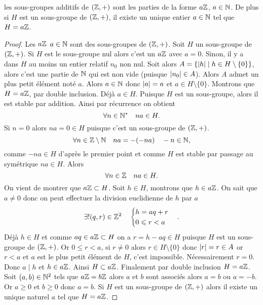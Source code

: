 \begin{theo}
  les sous-groupes additifs de \((\mathbb{Z},+)\) sont les parties de la forme \(a\mathbb{Z}\), \(a \in \mathbb{N}\). De plus si \(H\) est un sous-groupe de \((\mathbb{Z},+)\), il existe un unique entier \(a \in \mathbb{N}\) tel que \(H=a\mathbb{Z}\).
\end{theo}
\begin{proof}
  Les \(a\mathbb{Z}\) \(a \in \mathbb{N}\) sont des sous-groupes de \((\mathbb{Z},+)\). Soit \(H\) un sous-groupe de \((\mathbb{Z},+)\). Si \(H\) est le sous-groupe nul alors c'est un \(a\mathbb{Z}\) avec \(a=0\). Sinon, il y a dans \(H\) au moins un entier relatif \(n_0\) non nul. Soit alors \(A=\left\{\left\lvert h\right\rvert\mathrel{}\middle|\mathrel{}h \in H\setminus\{0\}\right\}\), alors c'est une partie de \(\mathbb{N}\) qui est non vide (puisque \(\left\lvert n_0\right\rvert \in A\)). Alors \(A\) admet un plus petit élément noté \(a\). Alors \(a \in \mathbb{N}\) donc \(\left\lvert a\right\rvert=a\) et \(a \in H\setminus\{0\}\). Montrons que \(H=a\mathbb{Z}\), par double inclusion. Déjà \(a \in H\). Puisque \(H\) est un sous-groupe, alors il est stable par addition. Ainsi par récurrence on obtient
  \begin{equation}
    \forall n \in \mathbb{N}^* \quad na \in H.
  \end{equation}
  Si \(n=0\) alors \(na=0 \in H\) puisque c'est un sous-groupe de \((\mathbb{Z},+)\). %
  \begin{equation}
    \forall n \in \mathbb{Z}\setminus\mathbb{N} \quad na=-(-na) \quad -n \in \mathbb{N},
  \end{equation}
  comme \(-na \in H\) d'après le premier point et comme \(H\) est stable par passage au symétrique \(na \in H\). Alors
  \begin{equation}
    \forall n \in \mathbb{Z} \quad na \in H.
  \end{equation}
  On vient de montrer que \(a\mathbb{Z} \subset H\). Soit \(h \in H\), montrons que \(h \in a\mathbb{Z}\). On sait que \(a \neq 0\) donc on peut effectuer la division euclidienne de \(h\) par \(a\)
  \begin{equation}
    \exists! (q,r) \in \mathbb{Z}^2 \quad \begin{cases} h=aq+r \\ 0 \leqslant r < a \end{cases}.
  \end{equation}
  Déjà \(h \in H\) et comme \(aq \in a\mathbb{Z} \subset H\) on a \(r=h-aq \in H\) puisque \(H\) est un sous-groupe de \((\mathbb{Z},+)\). Or \(0 \leqslant r < a\), si \(r \neq 0\) alors \(r \in H\setminus\{0\}\) donc \(\left\lvert r\right\rvert=r \in A\) or \(r < a\) et \(a\) est le plus petit élément de \(H\), c'est impossible. Nécessairement \(r=0\). Donc \(a\mid h\) et \(h \in a\mathbb{Z}\). Ainsi \(H \subset a\mathbb{Z}\). Finalement par double inclusion \(H=a\mathbb{Z}\). Soit \((a,b) \in \mathbb{N}^2\) tels que \(a\mathbb{Z}=b\mathbb{Z}\) alors \(a\) et \(b\) sont associés alors \(a=b\) ou \(a=-b\). Or \(a \geqslant 0\) et \(b \geqslant 0\) donc \(a=b\). Si \(H\) est un sous-groupe de \((\mathbb{Z},+)\) alors il existe un unique naturel \(a\) tel que \(H=a\mathbb{Z}\).
\end{proof}

